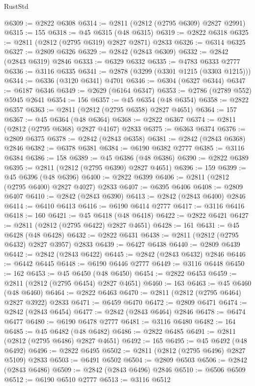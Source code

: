 \begin{lexlean}{RustStd}
\begin{coremodule}
{\begin{coremodule}
{{{{{{{{{{{{{{{{{{{{{{{{{{{{{{{{{@6309 := @2822 @6308
@6314 := @2811 (@2812 (@2795 @6309) @2827 @2991)
@6315 := 155
@6318 := @45 @6315 (@48 @6315)
@6319 := @2822 @6318
@6325 := @2811 (@2812 (@2795 @6319) @2827 @2871) @2833
@6326 := @6314 @6325
@6327 := @2809 @6326
@6329 := @2842 (@2843 @6309)
@6332 := @2842 (@2843 @6319) @2846
@6333 := @6329 @6332
@6335 := @4783 @6333 @2777
@6336 := @3116 @6335
@6341 := @2878 (@3299 (@3301 @1215 (@3303 @1215)))
@6344 := @6336 (@3120 @6341) @4701
@6346 := @6304 (@6327 @6344)
@6347 := @6187 @6346
@6349 := @2629 (@6164 @6347)
@6353 := @2786 (@2789 @552) @5945 @2641
@6354 := 156
@6357 := @45 @6354 (@48 @6354)
@6358 := @2822 @6357
@6363 := @2811 (@2812 (@2795 @6358) @2827 @4651)
@6364 := 157
@6367 := @45 @6364 (@48 @6364)
@6368 := @2822 @6367
@6374 := @2811 (@2812 (@2795 @6368) @2827 @4167) @2833
@6375 := @6363 @6374
@6376 := @2809 @6375
@6378 := @2842 (@2843 @6358)
@6381 := @2842 (@2843 @6368) @2846
@6382 := @6378 @6381
@6384 := @6190 @6382 @2777
@6385 := @3116 @6384
@6386 := 158
@6389 := @45 @6386 (@48 @6386)
@6390 := @2822 @6389
@6395 := @2811 (@2812 (@2795 @6390) @2827 @4651)
@6396 := 159
@6399 := @45 @6396 (@48 @6396)
@6400 := @2822 @6399
@6406 := @2811 (@2812 (@2795 @6400) @2827 @4027) @2833
@6407 := @6395 @6406
@6408 := @2809 @6407
@6410 := @2842 (@2843 @6390)
@6413 := @2842 (@2843 @6400) @2846
@6414 := @6410 @6413
@6416 := @6190 @6414 @2777
@6417 := @3116 @6416
@6418 := 160
@6421 := @45 @6418 (@48 @6418)
@6422 := @2822 @6421
@6427 := @2811 (@2812 (@2795 @6422) @2827 @4651)
@6428 := 161
@6431 := @45 @6428 (@48 @6428)
@6432 := @2822 @6431
@6438 := @2811 (@2812 (@2795 @6432) @2827 @3957) @2833
@6439 := @6427 @6438
@6440 := @2809 @6439
@6442 := @2842 (@2843 @6422)
@6445 := @2842 (@2843 @6432) @2846
@6446 := @6442 @6445
@6448 := @6190 @6446 @2777
@6449 := @3116 @6448
@6450 := 162
@6453 := @45 @6450 (@48 @6450)
@6454 := @2822 @6453
@6459 := @2811 (@2812 (@2795 @6454) @2827 @4651)
@6460 := 163
@6463 := @45 @6460 (@48 @6460)
@6464 := @2822 @6463
@6470 := @2811 (@2812 (@2795 @6464) @2827 @3922) @2833
@6471 := @6459 @6470
@6472 := @2809 @6471
@6474 := @2842 (@2843 @6454)
@6477 := @2842 (@2843 @6464) @2846
@6478 := @6474 @6477
@6480 := @6190 @6478 @2777
@6481 := @3116 @6480
@6482 := 164
@6485 := @45 @6482 (@48 @6482)
@6486 := @2822 @6485
@6491 := @2811 (@2812 (@2795 @6486) @2827 @4651)
@6492 := 165
@6495 := @45 @6492 (@48 @6492)
@6496 := @2822 @6495
@6502 := @2811 (@2812 (@2795 @6496) @2827 @5109) @2833
@6503 := @6491 @6502
@6504 := @2809 @6503
@6506 := @2842 (@2843 @6486)
@6509 := @2842 (@2843 @6496) @2846
@6510 := @6506 @6509
@6512 := @6190 @6510 @2777
@6513 := @3116 @6512
}}}}}}}}}}}}}}}}}}}}}}}}}}}}}}}}}
\end{coremodule}}
\end{coremodule}
\end{lexlean}
